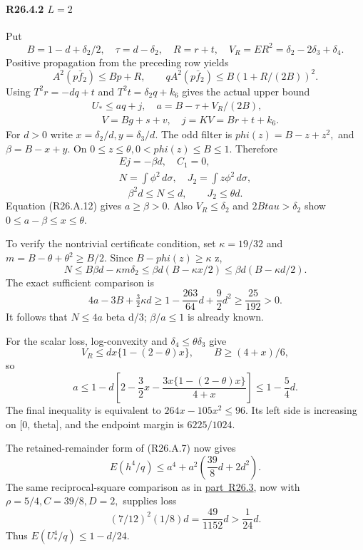 \paragraph{R26.4.2 \(L=2\)}

Put
\[
B=1-d+\delta_2/2,\quad\tau=d-\delta_2,\quad R=r+t,\quad
V_R=ER^2=\delta_2-2\delta_3+\delta_4.
\]
Positive propagation from the preceding row yields
\[
A^2(p\bar f_2)\le Bp+R,\qquad
qA^2(p\bar f_2)\le B(1+R/(2B))^2.
\]
Using \(T^2r=-dq+t\) and \(T^2t=\delta_2q+k_6\) gives the actual upper bound
\[
\begin{gathered}
U_*\le aq+j,\quad a=B-\tau+V_R/(2B),\\
\quad V=Bg+s+v,\quad j=KV=Br+t+k_6.
\end{gathered}\tag{R26.A.14}
\]
For \(d>0\) write \(x=\delta_2/d,\allowbreak  y=\delta_3/d.\) The odd filter is
\(phi(z)=B-z+z^2,\allowbreak \) and \(\beta=B-x+y.\) On \(0\le z\le \theta,\allowbreak  0<phi(z)\le B\le 1.\) Therefore
\[
\begin{gathered}
Ej=-\beta d,\quad C_1=0,\quad\\
N=\int\phi^2\,d\sigma,\quad J_2=\int z\phi^2\,d\sigma,
\end{gathered}
\]
\[
\beta^2d\le N\le d,\qquad J_2\le\theta d.
\]
Equation (R26.A.12) gives \(a\ge \beta>0.\) Also \(V_R\le \delta_2\) and
\(2Btau>\delta_2\) show \(0\le a-\beta\le x\le \theta.\)

To verify the nontrivial certificate condition, set \(\kappa=19/32\) and
\(m=B-\theta+\theta^2\ge B/2.\) Since \(B-phi(z)\ge \kappa\) z,
\[
N\le B\beta d-\kappa m \delta_2
\le\beta d(B-\kappa x/2)
\le\beta d(B-\kappa d/2).
\]
The exact sufficient comparison is
\[
4a-3B+\tfrac32\kappa d
\ge1-\frac{263}{64}d+\frac92d^2\ge\frac{25}{192}>0.
\]
It follows that \(N\le 4a\) beta d/3; \(\beta/a\le 1\) is already known.

For the scalar loss, log-convexity and \(\delta_4\le \theta \delta_3\) give
\[
V_R\le dx\{1-(2-\theta)x\},\qquad B\ge(4+x)/6,
\]
so
\[
a\le1-d\left[2-\frac32x-
\frac{3x\{1-(2-\theta)x\}}{4+x}\right]\le1-\frac54d.
\]
The final inequality is equivalent to \(264x-105x^2\le 96.\) Its left side is
increasing on [0, theta], and the endpoint margin is \(6225/1024.\)

The retained-remainder form of (R26.A.7) now gives
\[
E(h^4/q)\le a^4+a^2\left(\frac{39}{8}d+2d^2\right).
\]
The same reciprocal-square comparison as in \mbox{\hyperref[part:R26.3]{part R26.3}}, now with
\(\rho=5/4,\allowbreak  C=39/8,\allowbreak  D=2,\allowbreak \) supplies loss
\[
(7/12)^2(1/8)d=\frac{49}{1152}d>\frac1{24}d.
\]
Thus \(E(U_*^4/q)\le 1-d/24.\)

